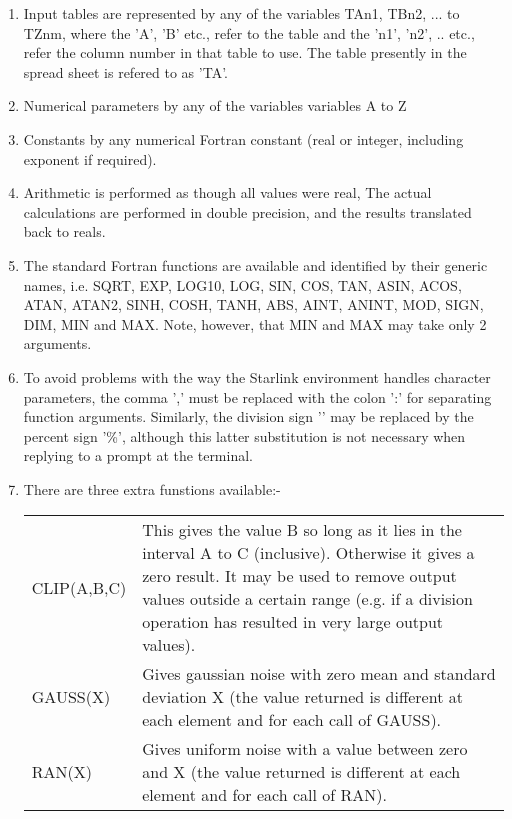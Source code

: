 {{ \begin{enumerate}
 \item Input tables are represented by any of the variables TAn1, TBn2, ...
    to TZnm, where the 'A', 'B' etc., refer to the table and the 'n1',
    'n2', .. etc., refer the column number in that table to use.
    The table presently in the spread sheet is refered to as 'TA'.
 \item Numerical parameters by any of the variables variables A to Z
 \item Constants by any numerical Fortran constant (real or integer,
    including exponent if required). 
 \item Arithmetic is performed as though all values were real, The actual
    calculations are performed in double precision, and the results
    translated back to reals.
 \item The standard Fortran functions are available and identified
    by their generic names, i.e. SQRT, EXP, LOG10, LOG, SIN, COS, TAN,
    ASIN, ACOS, ATAN, ATAN2, SINH, COSH, TANH, ABS, AINT, ANINT, MOD,
    SIGN, DIM, MIN and MAX. Note, however, that MIN and MAX may take only
    2 arguments. 
 \item To avoid problems with the way the Starlink environment
    handles character parameters, the comma ',' must be replaced with
    the colon ':' for separating function arguments. Similarly, the
    division sign '\/' may be replaced by the percent sign '\%', although
    this latter substitution is not necessary when replying to a prompt
    at the terminal. 
 \item There are three extra funstions available:-

    \begin{tabular}{lp{4in}}
    CLIP(A,B,C) & This gives the value B so long as it lies in the
                 interval A to C (inclusive). Otherwise it gives a
                 zero result. It may be used to remove output values 
                 outside a certain range (e.g. if a division operation 
                 has resulted in very large output values). \\
    GAUSS(X)   &  Gives gaussian noise with zero mean and standard 
                 deviation X (the value returned is different at each 
                 element and for each call of GAUSS). \\
    RAN(X)     &  Gives uniform noise with a value between zero and X
                 (the value returned is different at each element and 
                 for each call of RAN). \\
    \end{tabular}


\end{enumerate}}}
